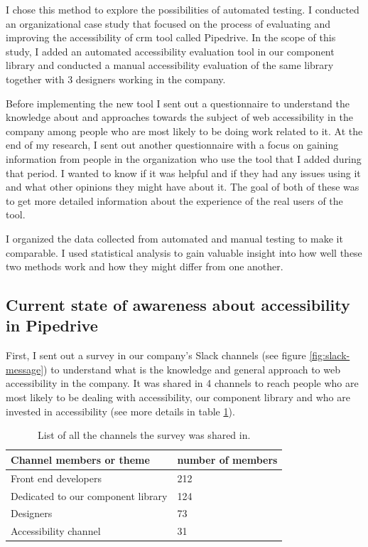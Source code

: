 \documentclass{master_thesis}
\begin{document}
I chose this method to explore the possibilities of automated testing. I conducted an organizational case study that focused on the process of evaluating and improving the accessibility of \ac{crm} tool called Pipedrive. In the scope of this study, I added an automated accessibility evaluation tool in our component library and conducted a manual accessibility evaluation of the same library together with 3 designers working in the company.

Before implementing the new tool I sent out a questionnaire to understand the knowledge about and approaches towards the subject of web accessibility in the company among people who are most likely to be doing work related to it. At the end of my research, I sent out another questionnaire with a focus on gaining information from people in the organization who use the tool that I added during that period. I wanted to know if it was helpful and if they had any issues using it and what other opinions they might have about it. The goal of both of these was to get more detailed information about the experience of the real users of the tool.

I organized the data collected from automated and manual testing to make it comparable. I used statistical analysis to gain valuable insight into how well these two methods work and how they might differ from one another.

\subsection{Current state of awareness about accessibility in Pipedrive}

First, I sent out a survey in our company's Slack channels (see figure \ref{fig:slack-message}) to understand what is the knowledge and general approach to web accessibility in the company. It was shared in 4 channels to reach people who are most likely to be dealing with accessibility, our component library and who are invested in accessibility (see more details in table \ref{table:survey-shared}).

\begin{table}[H]
	\centering
	\begin{tabular}{|l|l|}
		\hline
		\textbf{Channel members or theme} & \textbf{number of members}  \\
		\hline
		Front end developers  & 212  \\
		\hline
		Dedicated to our component library  & 124  \\
		\hline
		Designers  & 73  \\
		\hline
		Accessibility channel  & 31  \\
		\hline
	\end{tabular}
	\caption{List of all the channels the survey was shared in.}
	\label{table:survey-shared}
\end{table}
\end{document}
